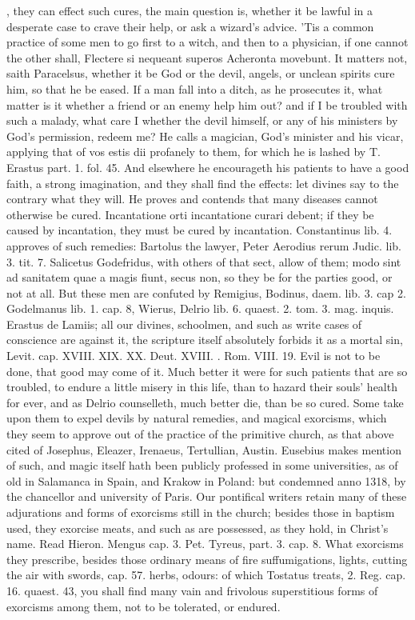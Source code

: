 {, they can effect such cures, the main question is, whether
it be lawful in a desperate case to crave their help, or ask a wizard's
advice. 'Tis a common practice of some men to go first to a witch, and
then to a physician, if one cannot the other shall, Flectere si
nequeant superos Acheronta movebunt. It matters not, saith
Paracelsus, whether it be God or the devil, angels, or unclean spirits
cure him, so that he be eased. If a man fall into a ditch, as he
prosecutes it, what matter is it whether a friend or an enemy help him
out? and if I be troubled with such a malady, what care I whether the
devil himself, or any of his ministers by God's permission, redeem me?
He calls a  magician, God's minister and his vicar, applying that
of vos estis dii profanely to them, for which he is lashed by T.
Erastus part. 1. fol. 45. And elsewhere he encourageth his patients to
have a good faith,  a strong imagination, and they shall find the
effects: let divines say to the contrary what they will. He proves and
contends that many diseases cannot otherwise be cured. Incantatione
orti incantatione curari debent; if they be caused by incantation,
they must be cured by incantation. Constantinus lib. 4. approves
of such remedies: Bartolus the lawyer, Peter Aerodius rerum Judic. lib.
3. tit. 7. Salicetus Godefridus, with others of that sect, allow of
them; modo sint ad sanitatem quae a magis fiunt, secus non, so they be
for the parties good, or not at all. But these men are confuted by
Remigius, Bodinus, daem. lib. 3. cap 2. Godelmanus lib. 1. cap. 8,
Wierus, Delrio lib. 6. quaest. 2. tom. 3. mag. inquis. Erastus de
Lamiis; all our divines, schoolmen, and such as write cases of
conscience are against it, the scripture itself absolutely forbids it
as a mortal sin, Levit. cap. XVIII. XIX. XX. Deut. XVIII. \etc{}. Rom.
VIII. 19. Evil is not to be done, that good may come of it. Much better
it were for such patients that are so troubled, to endure a little
misery in this life, than to hazard their souls' health for ever, and
as Delrio counselleth, much better die, than be so cured. Some
take upon them to expel devils by natural remedies, and magical
exorcisms, which they seem to approve out of the practice of the
primitive church, as that above cited of Josephus, Eleazer, Irenaeus,
Tertullian, Austin. Eusebius makes mention of such, and magic itself
hath been publicly professed in some universities, as of old in
Salamanca in Spain, and Krakow in Poland: but condemned anno 1318, by
the chancellor and university of Paris. Our pontifical writers
retain many of these adjurations and forms of exorcisms still in the
church; besides those in baptism used, they exorcise meats, and such as
are possessed, as they hold, in Christ's name. Read Hieron. Mengus cap.
3. Pet. Tyreus, part. 3. cap. 8. What exorcisms they prescribe, besides
those ordinary means of fire suffumigations, lights, cutting the
air with swords, cap. 57. herbs, odours: of which Tostatus treats, 2.
Reg. cap. 16. quaest. 43, you shall find many vain and frivolous
superstitious forms of exorcisms among them, not to be tolerated, or
endured.

}
